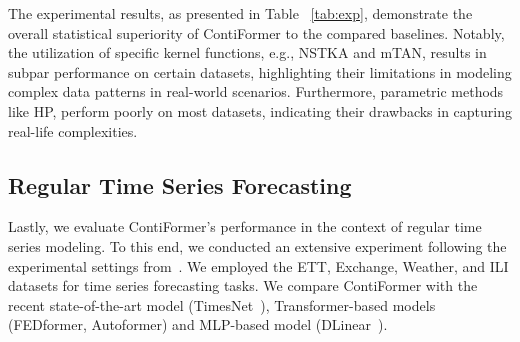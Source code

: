 \documentclass{article}
\begin{document}
The experimental results, as presented in Table ~\ref{tab:exp}, demonstrate the overall statistical superiority of ContiFormer to the compared baselines. Notably, the utilization of specific kernel functions, e.g., NSTKA and mTAN, results in subpar performance on certain datasets, highlighting their limitations in modeling complex data patterns in real-world scenarios.
Furthermore, parametric methods like HP, perform poorly on most datasets, indicating their drawbacks in capturing real-life complexities. 

\subsection{Regular Time Series Forecasting}

Lastly, we evaluate ContiFormer's performance in the context of regular time series modeling. To this end, we conducted an extensive experiment following the experimental settings from~\cite{wu2021autoformer}. 
We employed the ETT, Exchange, Weather, and ILI datasets for time series forecasting tasks. 
We compare ContiFormer with the recent state-of-the-art model (TimesNet~\cite{wu2022timesnet}), Transformer-based models (FEDformer\cite{zhou2022fedformer}, Autoformer\cite{wu2021autoformer}) and MLP-based model (DLinear~\cite{zeng2023transformers}). 
\end{document}
